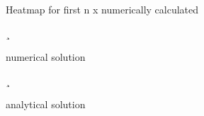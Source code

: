\documentclass[a4paper, 16pt]{article}
\begin{document}
\begin{figure}[H]
\caption{Heatmap for first n x numerically calculated}
\label{some example3}
\end{figure}



    \begin{figure}[!h]
¸    \caption{numerical solution}
        \label{fig: napaka}
    \end{figure}


    \begin{figure}[!h]
¸    \caption{analytical solution}
        \label{fig: heatana}
    \end{figure}
\end{document}
